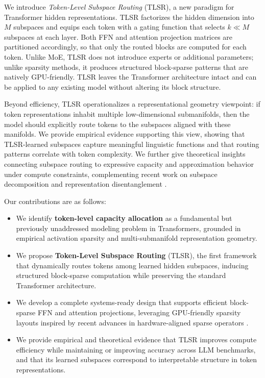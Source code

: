 \documentclass{article}
\theoremstyle{plain}
\theoremstyle{definition}
\theoremstyle{remark}
\begin{document}
We introduce \emph{Token-Level Subspace Routing} (TLSR), a new paradigm for
Transformer hidden representations.
TLSR factorizes the hidden dimension into $M$ subspaces and equips each token
with a gating function that selects $k \ll M$ subspaces at each layer.
Both FFN and attention projection matrices are partitioned accordingly, so
that only the routed blocks are computed for each token.
Unlike MoE, TLSR does not introduce experts or additional parameters; unlike
sparsity methods, it produces structured block-sparse patterns that are
natively GPU-friendly.
TLSR leaves the Transformer architecture intact and can be applied to any
existing model without altering its block structure.

Beyond efficiency, TLSR operationalizes a representational geometry viewpoint:
if token representations inhabit multiple low-dimensional submanifolds,
then the model should explicitly route tokens to the subspaces aligned with
these manifolds.
We provide empirical evidence supporting this view, showing that TLSR-learned
subspaces capture meaningful linguistic functions and that routing patterns
correlate with token complexity.
We further give theoretical insights connecting subspace routing to expressive
capacity and approximation behavior under compute constraints, complementing
recent work on subspace decomposition and representation disentanglement
\citep{huang2025ndm,csreft2025representation}.

Our contributions are as follows:
\begin{itemize}
    \item We identify \textbf{token-level capacity allocation} as a fundamental
    but previously unaddressed modeling problem in Transformers, grounded in
    empirical activation sparsity and multi-submanifold representation geometry.
    \item We propose \textbf{Token-Level Subspace Routing} (TLSR), the first
    framework that dynamically routes tokens among learned hidden subspaces,
    inducing structured block-sparse computation while preserving the standard
    Transformer architecture.
    \item We develop a complete systems-ready design that supports efficient
    block-sparse FFN and attention projections, leveraging GPU-friendly
    sparsity layouts inspired by recent advances in hardware-aligned sparse
    operators \citep{yu2023gpusqtlm,shen2024hardwareaware}.
    \item We provide empirical and theoretical evidence that TLSR improves
    compute efficiency while maintaining or improving accuracy across LLM
    benchmarks, and that its learned subspaces correspond to interpretable
    structure in token representations.
\end{itemize}
\end{document}
